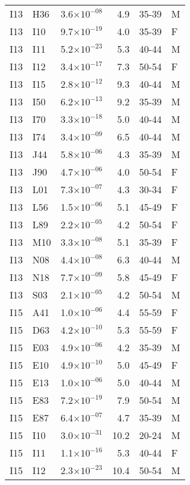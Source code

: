 \begin{longtable}{lllrll}
   I13 & H36 & 3.6$\times10^{-08}$ & 4.9 & 35-39 & M \\ 
   I13 & I10 & 9.7$\times10^{-19}$ & 4.0 & 35-39 & F \\ 
   I13 & I11 & 5.2$\times10^{-23}$ & 5.3 & 40-44 & M \\ 
   I13 & I12 & 3.4$\times10^{-17}$ & 7.3 & 50-54 & F \\ 
   I13 & I15 & 2.8$\times10^{-12}$ & 9.3 & 40-44 & M \\ 
   I13 & I50 & 6.2$\times10^{-13}$ & 9.2 & 35-39 & M \\ 
   I13 & I70 & 3.3$\times10^{-18}$ & 5.0 & 40-44 & M \\ 
   I13 & I74 & 3.4$\times10^{-09}$ & 6.5 & 40-44 & M \\ 
   I13 & J44 & 5.8$\times10^{-06}$ & 4.3 & 35-39 & M \\ 
   I13 & J90 & 4.7$\times10^{-06}$ & 4.0 & 50-54 & F \\ 
   I13 & L01 & 7.3$\times10^{-07}$ & 4.3 & 30-34 & F \\ 
   I13 & L56 & 1.5$\times10^{-06}$ & 5.1 & 45-49 & F \\ 
   I13 & L89 & 2.2$\times10^{-05}$ & 4.2 & 50-54 & F \\ 
   I13 & M10 & 3.3$\times10^{-08}$ & 5.1 & 35-39 & F \\ 
   I13 & N08 & 4.4$\times10^{-08}$ & 6.3 & 40-44 & M \\ 
   I13 & N18 & 7.7$\times10^{-09}$ & 5.8 & 45-49 & F \\ 
   I13 & S03 & 2.1$\times10^{-05}$ & 4.2 & 50-54 & M \\ 
   I15 & A41 & 1.0$\times10^{-06}$ & 4.4 & 55-59 & F \\ 
   I15 & D63 & 4.2$\times10^{-10}$ & 5.3 & 55-59 & F \\ 
   I15 & E03 & 4.9$\times10^{-06}$ & 4.2 & 35-39 & M \\ 
   I15 & E10 & 4.9$\times10^{-10}$ & 5.0 & 45-49 & F \\ 
   I15 & E13 & 1.0$\times10^{-06}$ & 5.0 & 40-44 & M \\ 
   I15 & E83 & 7.2$\times10^{-19}$ & 7.9 & 50-54 & M \\ 
   I15 & E87 & 6.4$\times10^{-07}$ & 4.7 & 35-39 & M \\ 
   I15 & I10 & 3.0$\times10^{-31}$ & 10.2 & 20-24 & M \\ 
   I15 & I11 & 1.1$\times10^{-16}$ & 5.3 & 40-44 & F \\ 
   I15 & I12 & 2.3$\times10^{-23}$ & 10.4 & 50-54 & M \\ 

\end{longtable}
